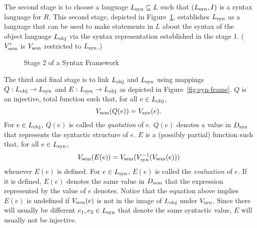\documentclass[11pt,fleqn]{article}
\newcommand{\tarrow}{\rightarrow}
\begin{document}
The second stage is to choose a language $L_{\rm syn} \subseteq L$
such that $(L_{\rm syn},I)$ is a syntax language for $R$.  This second
stage, depicted in Figure~\ref{fig:syn-frame-stage-2}, establishes
$L_{\rm syn}$ as a language that can be used to make statements in $L$
about the syntax of the object language $L_{\rm obj}$ via the syntax
representation established in the stage 1.  ($V'_{\rm sem}$ is $V_{\rm
  sem}$ restricted to $L_{\rm syn}$.)

\begin{figure}
\center
{}
\caption{Stage 2 of a Syntax Framework}  \label{fig:syn-frame-stage-2}
\end{figure}

The third and final stage is to link $L_{\rm obj}$ and $L_{\rm syn}$
using mappings $Q : L_{\rm obj} \tarrow L_{\rm syn}$ and $E : L_{\rm
  syn} \tarrow L_{\rm obj}$ as depicted in Figure~\ref{fig:syn-frame}.
$Q$ is an injective, total function such that, for all $e \in L_{\rm
  obj}$, \[V_{\rm sem}(Q(e)) = V_{\rm syn}(e).\] For $e \in L_{\rm
  obj}$, $Q(e)$ is called the \emph{quotation} of $e$.  $Q(e)$ denotes
a value in $D_{\rm syn}$ that represents the syntactic structure of
$e$.  $E$ is a (possibly partial) function such that, for all $e \in
L_{\rm syn}$, \[V_{\rm sem}(E(e)) = V_{\rm sem}(V_{\rm
  syn}^{-1}(V_{\rm sem}(e)))\] whenever $E(e)$ is defined.  For $e \in
L_{\rm syn}$, $E(e)$ is called the \emph{evaluation} of $e$.  If it is
defined, $E(e)$ denotes the same value in $D_{\rm sem}$ that the
expression represented by the value of $e$ denotes.  Notice that the
equation above implies $E(e)$ is undefined if $V_{\rm sem}(e)$ is not
in the image of $L_{\rm obj}$ under $V_{\rm syn}$.  Since there will
usually be different $e_1,e_2 \in L_{\rm syn}$ that denote the same
syntactic value, $E$ will usually not be injective.
\end{document}
